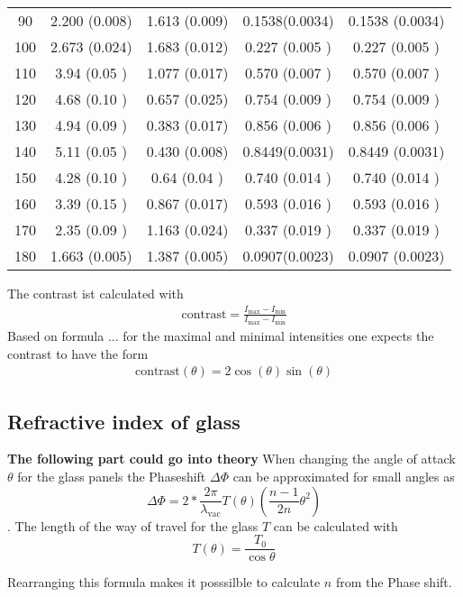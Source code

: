 \begin{table}[H]
\begin{tabular}{S S S S S}
		90                            & 2.200 (0.008)                 & 1.613 (0.009)                 & 0.1538(0.0034) & 0.1538 (0.0034) \\
		100                           & 2.673 (0.024)                 & 1.683 (0.012)                 & 0.227 (0.005 ) & 0.227 (0.005 )  \\
		110                           & 3.94  (0.05 )                 & 1.077 (0.017)                 & 0.570 (0.007 ) & 0.570 (0.007 )  \\
		120                           & 4.68  (0.10 )                 & 0.657 (0.025)                 & 0.754 (0.009 ) & 0.754 (0.009 )  \\
		130                           & 4.94  (0.09 )                 & 0.383 (0.017)                 & 0.856 (0.006 ) & 0.856 (0.006 )  \\
		140                           & 5.11  (0.05 )                 & 0.430 (0.008)                 & 0.8449(0.0031) & 0.8449 (0.0031) \\
		150                           & 4.28  (0.10 )                 & 0.64  (0.04 )                 & 0.740 (0.014 ) & 0.740 (0.014 )  \\
		160                           & 3.39  (0.15 )                 & 0.867 (0.017)                 & 0.593 (0.016 ) & 0.593 (0.016 )  \\
		170                           & 2.35  (0.09 )                 & 1.163 (0.024)                 & 0.337 (0.019 ) & 0.337 (0.019 )  \\
		180                           & 1.663 (0.005)                 & 1.387 (0.005)                 & 0.0907(0.0023) & 0.0907 (0.0023) \\
        \bottomrule
	\end{tabular}

\end{table}

The contrast ist calculated with
\begin{align}
    \text{contrast} = \frac{I_\text{max} -I_\text{min}}{I_\text{max}-I_\text{min}}
\end{align}
Based on formula ... for the maximal and minimal intensities one expects the contrast to have the form
\begin{align}
    \text{contrast}(\theta) = 2\cos(\theta)\sin(\theta) 
\end{align}

\subsection{Refractive index of glass}
\textbf{The following part could go into theory}
When changing the angle of attack $\theta$ for the glass panels the Phaseshift $\Delta\Phi$ can be approximated for small angles
as 
$$\Delta\Phi = 2* \frac{2\pi}{\lambda_\text{vac}} T(\theta)\left(\frac{n-1}{2n} \theta^2 \right)$$.
The length of the way of travel for the glass $T$ can be calculated with
$$T(\theta) = \frac{T_0}{\cos\theta}$$

Rearranging this formula makes it posssilble to calculate $n$ from the Phase shift.





